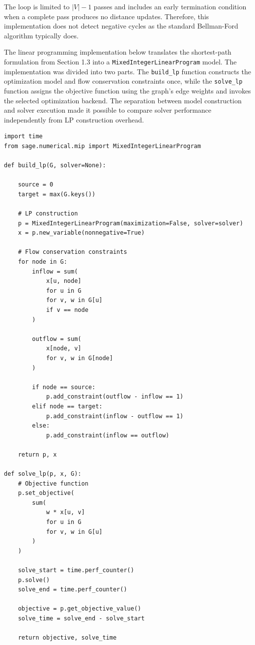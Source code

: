 \documentclass[12pt]{report}
\begin{document}
The loop is limited to $|V| - 1$ passes and includes an early termination condition when a complete pass produces no distance updates. Therefore, this implementation does not detect negative cycles as the standard Bellman-Ford algorithm typically does. 

The linear programming implementation below translates the shortest-path formulation from Section 1.3 into a \texttt{MixedIntegerLinearProgram} model. The implementation was divided into two parts. The \texttt{build\_lp} function constructs the optimization model and flow conservation constraints once, while the \texttt{solve\_lp} function assigns the objective function using the graph's edge weights and invokes the selected optimization backend. The separation between model construction and solver execution made it possible to compare solver performance independently from LP construction overhead.

\begin{verbatim}
import time
from sage.numerical.mip import MixedIntegerLinearProgram

def build_lp(G, solver=None):

    source = 0
    target = max(G.keys())

    # LP construction
    p = MixedIntegerLinearProgram(maximization=False, solver=solver)
    x = p.new_variable(nonnegative=True)

    # Flow conservation constraints
    for node in G:
        inflow = sum(
            x[u, node]
            for u in G
            for v, w in G[u]
            if v == node
        )

        outflow = sum(
            x[node, v]
            for v, w in G[node]
        )

        if node == source:
            p.add_constraint(outflow - inflow == 1)
        elif node == target:
            p.add_constraint(inflow - outflow == 1)
        else:
            p.add_constraint(inflow == outflow)

    return p, x

def solve_lp(p, x, G):
    # Objective function
    p.set_objective(
        sum(
            w * x[u, v]
            for u in G
            for v, w in G[u]
        )
    )

    solve_start = time.perf_counter()
    p.solve()
    solve_end = time.perf_counter()

    objective = p.get_objective_value()
    solve_time = solve_end - solve_start

    return objective, solve_time
\end{verbatim}
\end{document}
